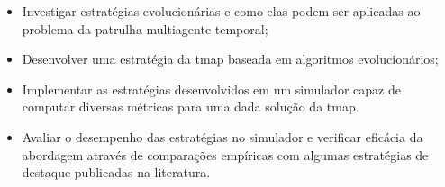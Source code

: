 \begin{itemize}
	\item Investigar estratégias evolucionárias e como elas podem ser aplicadas 
		ao problema da patrulha multiagente temporal;
	\item Desenvolver uma estratégia da \ac{tmap} baseada em algoritmos  
		evolucionários;
	\item Implementar as estratégias desenvolvidos em um simulador capaz de 
		computar diversas métricas para uma dada solução da \ac{tmap}.
	\item Avaliar o desempenho das estratégias no simulador e verificar eficácia
		da abordagem através de comparações empíricas com algumas estratégias de 
		destaque publicadas na literatura.
\end{itemize}